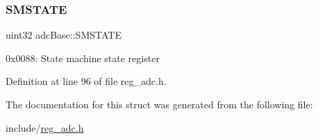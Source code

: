 \subsubsection{\texorpdfstring{S\+M\+S\+T\+A\+TE}{SMSTATE}}
{\footnotesize\ttfamily uint32 adc\+Base\+::\+S\+M\+S\+T\+A\+TE}

0x0088\+: State machine state register 

Definition at line 96 of file reg\+\_\+adc.\+h.



The documentation for this struct was generated from the following file\+:\begin{DoxyCompactItemize}
\item 
include/\mbox{\hyperlink{reg__adc_8h}{reg\+\_\+adc.\+h}}\end{DoxyCompactItemize}
